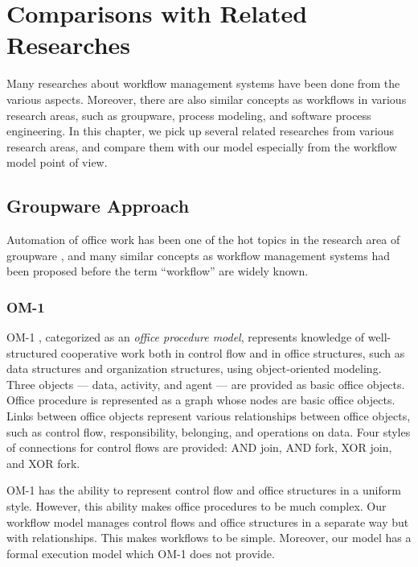 
\chapter{Comparisons with Related Researches}
\label{chap:relatedworks}

Many researches about workflow management systems have been done from
the various aspects.  Moreover, there are also similar concepts as
workflows in various research areas, such as groupware, process
modeling, and software process engineering.  In this chapter, we pick up
several related researches from various research areas, and compare them
with our model especially from the workflow model point of view.

\section{Groupware Approach}

Automation of office work has been one of the hot topics in the research 
area of groupware \cite{ellis:acmcs80}, and many similar concepts as
workflow management systems had been proposed before the term
``workflow'' are widely known.

\subsection{OM-1}

OM-1 \cite{ishii:tripsj86,ishii:jip91}, categorized as an {\em office
procedure model}, represents knowledge of well-structured cooperative
work both in control flow and in office structures, such as data
structures and organization structures, using object-oriented modeling.
Three objects --- data, activity, and agent --- are provided as basic
office objects.  Office procedure is represented as a graph whose nodes
are basic office objects.  Links between office objects represent
various relationships between office objects, such as control flow,
responsibility, belonging, and operations on data.  Four styles of
connections for control flows are provided:  AND join, AND fork, XOR
join, and XOR fork.  

OM-1 has the ability to represent control flow and office structures in
a uniform style.  However, this ability makes office procedures to be
much complex.  Our workflow model manages control flows and office
structures in a separate way but with relationships.  This makes
workflows to be simple.  Moreover, our model has a formal execution
model which OM-1 does not provide.

